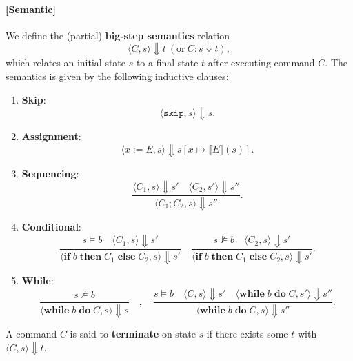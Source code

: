 \paragraph{[Semantic]}  We define the (partial) \textbf{big‐step semantics} relation \[
\langle C, s \rangle \Downarrow  t\ (\text{or}\ C:s\Downarrow t),
\] which relates an initial state \(s\) to a final state \(t\) after executing command \(C\). The semantics is given by the following inductive clauses:
\begin{enumerate}
	\item \textbf{Skip}: \[
	\langle \texttt{skip}, s \rangle \Downarrow s.
	\]
	\item \textbf{Assignment}: \[
	\langle x := E, s \rangle \Downarrow s[x \mapsto \llbracket E \rrbracket(s)].
	\]
	\item \textbf{Sequencing}: \[
	\frac{\langle C_1, s \rangle \Downarrow s' \quad \langle C_2, s' \rangle \Downarrow s''}{\langle C_1; C_2, s \rangle \Downarrow s''}.
	\]
	\item \textbf{Conditional}: \[
	\frac{s \models b \quad \langle C_1, s \rangle \Downarrow s'}{\langle \mathbf{if}\; b\; \mathbf{then}\; C_1\; \mathbf{else}\; C_2, s \rangle \Downarrow s'} \quad
	\frac{s \not\models b \quad \langle C_2, s \rangle \Downarrow s'}{\langle \mathbf{if}\; b\; \mathbf{then}\; C_1\; \mathbf{else}\; C_2, s \rangle \Downarrow s'}.
	\]
	\item \textbf{While}: \[
	\frac{s \not\models b}{\langle \mathbf{while}\; b\; \mathbf{do}\; C, s \rangle \Downarrow s}\quad,\quad
	\frac{s \models b \quad \langle C, s \rangle \Downarrow s' \quad \langle \mathbf{while}\; b\; \mathbf{do}\; C, s' \rangle \Downarrow s''}{\langle \mathbf{while}\; b\; \mathbf{do}\; C, s \rangle \Downarrow s''}.
	\]
\end{enumerate}
A command \(C\) is said to \textbf{terminate} on state \(s\) if there exists some \(t\) with \(\langle C, s \rangle \Downarrow t\).

